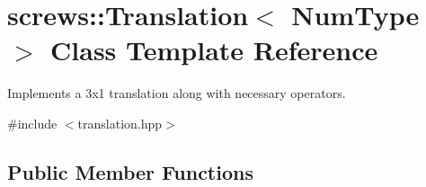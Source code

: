\hypertarget{singletonscrews_1_1_translation}{\section{screws\+:\+:Translation$<$ Num\+Type $>$ Class Template Reference}
\label{singletonscrews_1_1_translation}
}


Implements a 3x1 translation along with necessary operators.  




{\ttfamily \#include $<$translation.\+hpp$>$}

\subsection*{Public Member Functions}
